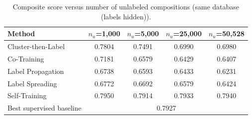 \begin{table}[H]
\centering\small
\begin{tabular}{lcccc}
\toprule
Method & $n_u$=1,000 & $n_u$=5,000 & $n_u$=25,000 & $n_u$=50,528\\
\midrule
Cluster-then-Label & 0.7804 & 0.7491 & 0.6990 & 0.6980 \\
Co-Training & 0.7181 & 0.6579 & 0.6429 & 0.6407 \\
Label Propagation & 0.6738 & 0.6593 & 0.6433 & 0.6231 \\
Label Spreading & 0.6772 & 0.6692 & 0.6579 & 0.6424 \\
Self-Training & 0.7950 & 0.7914 & 0.7933 & 0.7940 \\
\midrule
Best supervised baseline & \multicolumn{4}{c}{0.7927}\\
\bottomrule
\end{tabular}
\caption*{Composite score versus number of unlabeled compositions (same database (labels hidden)).}
\end{table}
